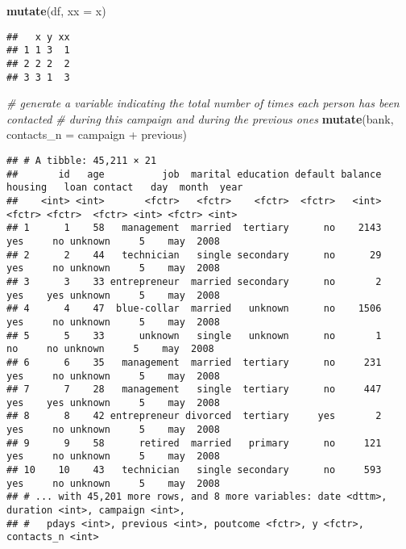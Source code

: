 \documentclass[]{book}
\newenvironment{Shaded}{\begin{snugshade}}{\end{snugshade}}
\newcommand{\KeywordTok}[1]{\textcolor[rgb]{0.13,0.29,0.53}{\textbf{{#1}}}}
\newcommand{\DataTypeTok}[1]{\textcolor[rgb]{0.13,0.29,0.53}{{#1}}}
\newcommand{\StringTok}[1]{\textcolor[rgb]{0.31,0.60,0.02}{{#1}}}
\newcommand{\CommentTok}[1]{\textcolor[rgb]{0.56,0.35,0.01}{\textit{{#1}}}}
\newcommand{\NormalTok}[1]{{#1}}
\begin{document}
\begin{Shaded}
\begin{Highlighting}[]
\KeywordTok{mutate}\NormalTok{(df, }\DataTypeTok{xx =} \NormalTok{x)}
\end{Highlighting}
\end{Shaded}

\begin{verbatim}
##   x y xx
## 1 1 3  1
## 2 2 2  2
## 3 3 1  3
\end{verbatim}

\begin{Shaded}
\begin{Highlighting}[]
\CommentTok{# generate a variable indicating the total number of times each person has been contacted }
\CommentTok{# during this campaign and during the previous ones }
\KeywordTok{mutate}\NormalTok{(bank, }\DataTypeTok{contacts_n =} \NormalTok{campaign +}\StringTok{ }\NormalTok{previous)}
\end{Highlighting}
\end{Shaded}

\begin{verbatim}
## # A tibble: 45,211 × 21
##       id   age          job  marital education default balance housing   loan contact   day  month  year
##    <int> <int>       <fctr>   <fctr>    <fctr>  <fctr>   <int>  <fctr> <fctr>  <fctr> <int> <fctr> <int>
## 1      1    58   management  married  tertiary      no    2143     yes     no unknown     5    may  2008
## 2      2    44   technician   single secondary      no      29     yes     no unknown     5    may  2008
## 3      3    33 entrepreneur  married secondary      no       2     yes    yes unknown     5    may  2008
## 4      4    47  blue-collar  married   unknown      no    1506     yes     no unknown     5    may  2008
## 5      5    33      unknown   single   unknown      no       1      no     no unknown     5    may  2008
## 6      6    35   management  married  tertiary      no     231     yes     no unknown     5    may  2008
## 7      7    28   management   single  tertiary      no     447     yes    yes unknown     5    may  2008
## 8      8    42 entrepreneur divorced  tertiary     yes       2     yes     no unknown     5    may  2008
## 9      9    58      retired  married   primary      no     121     yes     no unknown     5    may  2008
## 10    10    43   technician   single secondary      no     593     yes     no unknown     5    may  2008
## # ... with 45,201 more rows, and 8 more variables: date <dttm>, duration <int>, campaign <int>,
## #   pdays <int>, previous <int>, poutcome <fctr>, y <fctr>, contacts_n <int>
\end{verbatim}
\end{document}
